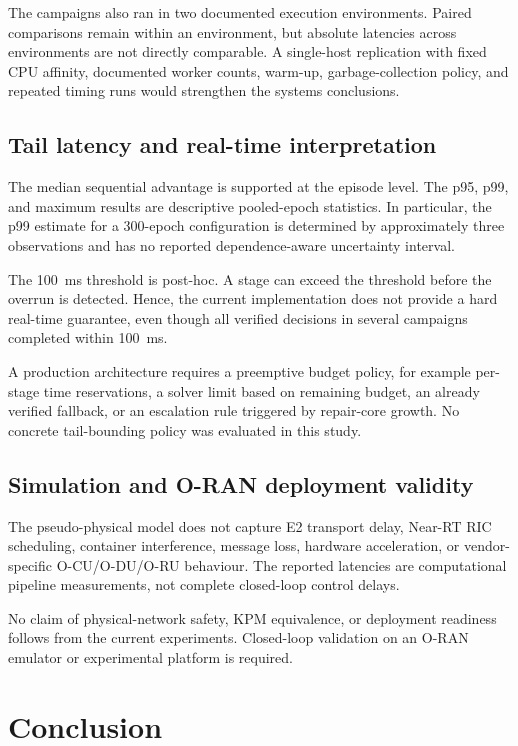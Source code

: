\documentclass[pdflatex,sn-mathphys-num,iicol,oneside]{sn-jnl}
\begin{document}
The campaigns also ran in two documented execution environments.
Paired comparisons remain within an environment, but absolute
latencies across environments are not directly comparable. A
single-host replication with fixed CPU affinity, documented worker
counts, warm-up, garbage-collection policy, and repeated timing runs
would strengthen the systems conclusions.

\subsection{Tail latency and real-time interpretation}

The median sequential advantage is supported at the episode level.
The p95, p99, and maximum results are descriptive pooled-epoch
statistics. In particular, the p99 estimate for a 300-epoch
configuration is determined by approximately three observations and
has no reported dependence-aware uncertainty interval.

The 100~ms threshold is post-hoc. A stage can exceed the threshold
before the overrun is detected. Hence, the current implementation
does not provide a hard real-time guarantee, even though all verified
decisions in several campaigns completed within 100~ms.

A production architecture requires a preemptive budget policy, for
example per-stage time reservations, a solver limit based on remaining
budget, an already verified fallback, or an escalation rule triggered
by repair-core growth. No concrete tail-bounding policy was evaluated
in this study.

\subsection{Simulation and O-RAN deployment validity}

The pseudo-physical model does not capture E2 transport delay,
Near-RT RIC scheduling, container interference, message loss,
hardware acceleration, or vendor-specific O-CU/O-DU/O-RU behaviour.
The reported latencies are computational pipeline measurements, not
complete closed-loop control delays.

No claim of physical-network safety, KPM equivalence, or deployment
readiness follows from the current experiments. Closed-loop
validation on an O-RAN emulator or experimental platform is required.

\section{Conclusion}
\label{sec:conclusion}
\end{document}
